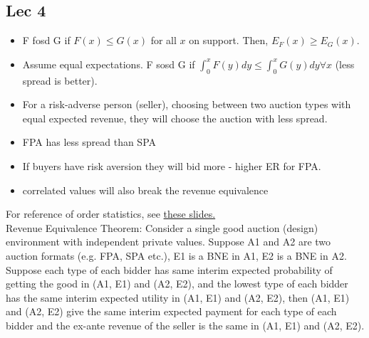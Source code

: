 \documentclass[11pt]{article} %
\begin{document}
\subsection{Lec 4}
\begin{itemize}
\item F fosd G if $F(x)\leq G(x)$ for all $x$ on support. Then, $E_F(x)\geq E_G(x)$.
\item Assume equal expectations. F sosd G if $\int_{0}^{x}F(y)dy \leq \int_0^x G(y)dy \forall x$ (less spread is better).
\item For a risk-adverse person (seller), choosing between two auction types with equal expected revenue, they will choose the auction with less spread.
\item FPA has less spread than SPA
\item If buyers have risk aversion they will bid more - higher ER for FPA.
\item correlated values will also break the revenue equivalence 
\end{itemize}
For reference of order statistics, see \href{https://www2.stat.duke.edu/courses/Spring12/sta104.1/Lectures/Lec15.pdf}{these slides.} \\
Revenue Equivalence Theorem: Consider a single good auction (design) environment with independent private values. Suppose A1 and A2 are two auction formats (e.g. FPA, SPA etc.), E1 is a BNE in A1, E2 is a BNE in A2. Suppose each type of each bidder has same interim expected probability of getting the good in (A1, E1) and (A2, E2), and the lowest type of each bidder has the same interim expected utility in (A1, E1) and (A2, E2), then (A1, E1) and (A2, E2) give the same interim expected payment for each type of each bidder and the ex-ante revenue of the seller is the same in (A1, E1) and (A2, E2).
\end{document}
